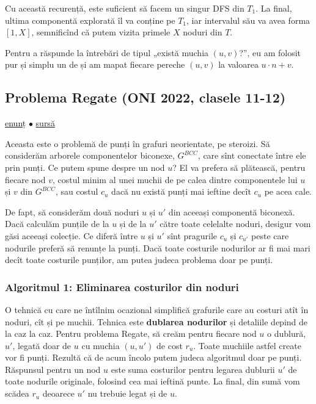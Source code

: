 \documentclass[../main.tex]{subfiles}
\begin{document}
Cu această recurență, este suficient să facem un singur DFS din $T_1$. La final, ultima componentă explorată îl va conține pe $T_1$, iar intervalul său va avea forma $[1, X]$, semnificînd că putem vizita primele $X$ noduri din $T$.

Pentru a răspunde la întrebări de tipul „există muchia $(u,v)$?”, eu am folosit pur și simplu un  de  și am mapat fiecare pereche $(u,v)$ la valoarea $u \cdot n + v$.

\subsection{Problema Regate (ONI 2022, clasele 11-12)}
\label{problem:regate}

\href{https://kilonova.ro/problems/138}{enunț}
$\bullet$
\hyperref[code:regate]{sursă}

Aceasta este o problemă de punți în grafuri neorientate, pe steroizi. Să considerăm arborele componentelor biconexe, $G^{BCC}$, care sînt conectate între ele prin punți. Ce putem spune despre un nod $u$? El va prefera să plătească, pentru fiecare nod $v$, costul minim al unei muchii de pe calea dintre componentele lui $u$ și $v$ din $G^{BCC}$, sau costul $c_u$ dacă nu există punți mai ieftine decît $c_u$ pe acea cale.

De fapt, să considerăm două noduri $u$ și $u'$ din aceeași componentă biconexă. Dacă calculăm punțile de la $u$ și de la $u'$ către toate celelalte noduri, desigur vom găsi aceeași colecție. Ce diferă între $u$ și $u'$ sînt pragurile $c_u$ și $c_{u'}$ peste care nodurile preferă să renunțe la punți. Dacă toate costurile nodurilor ar fi mai mari decît toate costurile punților, am putea judeca problema doar pe punți.

\subsubsection*{Algoritmul 1: Eliminarea costurilor din noduri}

O tehnică cu care ne întîlnim ocazional simplifică grafurile care au costuri atît în noduri, cît și pe muchii. Tehnica este \textbf{dublarea nodurilor} și detaliile depind de la caz la caz. Pentru problema Regate, să creăm pentru fiecare nod $u$ o dublură, $u'$, legată doar de $u$ cu muchia $(u, u')$ de cost $r_u$. Toate muchiile astfel create vor fi punți. Rezultă că de acum încolo putem judeca algoritmul doar pe punți. Răspunsul pentru un nod $u$ este suma costurilor pentru legarea dublurii $u'$ de toate nodurile originale, folosind cea mai ieftină punte. La final, din sumă vom scădea $r_u$ deoarece $u'$ nu trebuie legat și de $u$.
\end{document}
